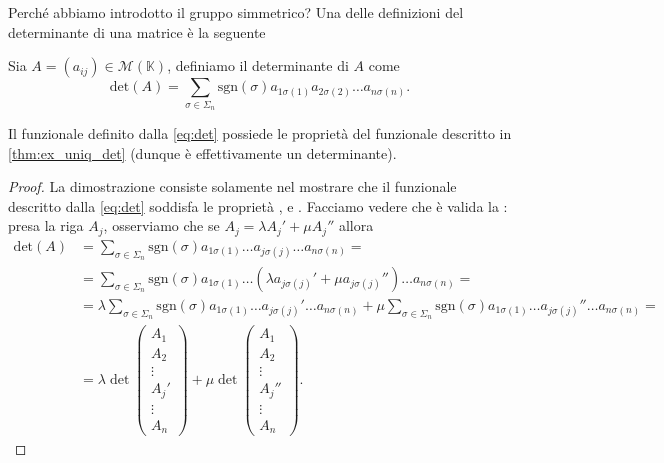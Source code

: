 Perché abbiamo introdotto il gruppo simmetrico? Una delle definizioni del determinante di una matrice è la seguente
\begin{definition}
    Sia $A = (a_{ij}) \in \mathcal{M}(\mathbb{K})$, definiamo il determinante di $A$ come
    \begin{equation}
        \text{det}(A) = \sum_{\sigma \in \Sigma_n} \text{sgn}(\sigma) a_{1\sigma(1)} a_{2\sigma(2)} \ldots a_{n \sigma(n)}. \label{eq:det}
    \end{equation}
\end{definition}
\begin{theorem}
    Il funzionale definito dalla \ref{eq:det} possiede le proprietà del funzionale descritto in \ref{thm:ex_uniq_det} (dunque è effettivamente un determinante).
\end{theorem}
\begin{proof}
    La dimostrazione consiste solamente nel mostrare che il funzionale descritto dalla \ref{eq:det} soddisfa le proprietà ,  e . Facciamo vedere che è valida la : presa la riga $A_j$, osserviamo che se $A_j = \lambda A_j' + \mu A_j''$ allora
    \begin{align}
        \text{det}(A) &= \sum_{\sigma \in \Sigma_n} \text{sgn}(\sigma)a_{1\sigma(1)} \ldots a_{j \sigma(j)} \ldots a_{n \sigma(n)} = \\
        &= \sum_{\sigma \in \Sigma_n} \text{sgn}(\sigma) a_{1\sigma(1)} \ldots (\lambda a_{j \sigma(j)}' + \mu a_{j \sigma(j)}'') \ldots a_{n \sigma(n)} = \\
        &= \lambda \sum_{\sigma \in \Sigma_n} \text{sgn}(\sigma) a_{1 \sigma(1)} \ldots a_{j\sigma(j)}' \ldots a_{n \sigma(n)} + \mu \sum_{\sigma \in \Sigma_n} \text{sgn}(\sigma) a_{1\sigma(1)} \ldots a_{j \sigma(j)}'' \ldots a_{n \sigma(n)} = \\
        &=\lambda \det{\begin{pmatrix} A_1 \\ A_2 \\ \vdots \\ A_j' \\ \vdots \\ A_n \end{pmatrix}} + \mu \det{\begin{pmatrix} A_1 \\ A_2 \\ \vdots \\ A_j'' \\ \vdots \\ A_n \end{pmatrix}}.

\end{align}
\end{proof}
